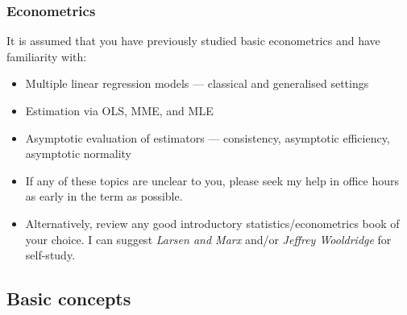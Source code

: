 \documentclass[
  letterpaper,
  DIV=11,
  numbers=noendperiod]{scrartcl}
\providecommand{\tightlist}{%
  \setlength{\itemsep}{0pt}\setlength{\parskip}{0pt}}
\begin{document}
\subsubsection{Econometrics}\label{econometrics}

It is assumed that you have previously studied basic econometrics and
have familiarity with:

\begin{itemize}
\tightlist
\item
  Multiple linear regression models --- classical and generalised
  settings
\item
  Estimation via OLS, MME, and MLE
\item
  Asymptotic evaluation of estimators --- consistency, asymptotic
  efficiency, asymptotic normality
\end{itemize}

\begin{tcolorbox}[enhanced jigsaw, arc=.35mm, bottomrule=.15mm, bottomtitle=1mm, breakable, colback=white, colbacktitle=quarto-callout-important-color!10!white, colframe=quarto-callout-important-color-frame, coltitle=black, left=2mm, leftrule=.75mm, opacityback=0, opacitybacktitle=0.6, rightrule=.15mm, title=\textcolor{quarto-callout-important-color}{\faExclamation}\hspace{0.5em}{Important}, titlerule=0mm, toprule=.15mm, toptitle=1mm]

\begin{itemize}
\tightlist
\item
  If any of these topics are unclear to you, please seek my help in
  office hours as early in the term as possible.
\item
  Alternatively, review any good introductory statistics/econometrics
  book of your choice. I can suggest \emph{Larsen and Marx} and/or
  \emph{Jeffrey Wooldridge} for self-study.
\end{itemize}

\end{tcolorbox}

\subsection{Basic concepts}\label{basic-concepts}
\end{document}
